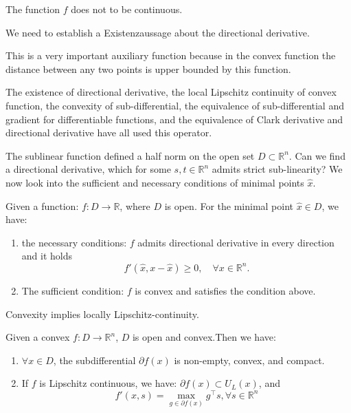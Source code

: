 \begin{remark}
	The function $f$ does not to be continuous.
\end{remark}
We need to establish a Existenzaussage about the directional derivative.


This is a very important auxiliary function because in the convex function the distance between any two points is upper bounded by this function.\par The existence of directional derivative, the local Lipschitz continuity of convex function, the convexity of sub-differential, the equivalence of sub-differential and gradient for differentiable functions, and the equivalence of Clark derivative and directional derivative have all used this operator. 





The sublinear function defined a half norm on the open set $D \subset \mathbb{R}^n$. Can we find a directional derivative, which for some $s, t \in \mathbb{R}^n$ admits strict sub-linearity?
We now look into the sufficient and necessary conditions of minimal points $\hat{x}$. 


\begin{theorem}[NOB]
	Given a function: $f :D \longrightarrow \mathbb{R}$, where $D$ is open. For the minimal point $\hat{x} \in D$, we have:
	\begin{enumerate}
		\item the necessary conditions: $f$ admits directional derivative in every direction and it holds
		\begin{equation}
			f'(\hat{x}, x - \hat{x}) \geq 0,\quad \forall x \in \mathbb{R}^n	.
		\end{equation}
		\item The sufficient condition: $f$ is convex and satisfies the condition above.
	\end{enumerate}
\end{theorem}

\begin{remark}
Convexity implies locally Lipschitz-continuity. 	
\end{remark}

\begin{theorem}
	Given a convex $f: D \longrightarrow \mathbb{R}^n$, $D$ is open and convex.Then we have:
	\begin{enumerate}
		\item $\forall x \in D$, the subdifferential $\partial f(x)$ is non-empty, convex, and compact.
		\item If $f$ is Lipschitz continuous, we have: $\partial f(x) \subset U_L(x)$, and \begin{equation}
			f'(x,s) = \max_{g \in \partial f(x)}g^\top s, \forall s \in \mathbb{R}^n
		\end{equation}
	\end{enumerate} 
\end{theorem}

